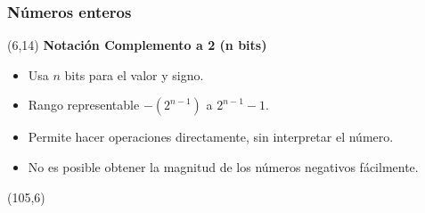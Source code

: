 \documentclass[aspectratio=169]{beamer}
\begin{document}
\begin{frame}[fragile]
    \frametitle{Números enteros}
    \begin{textblock}{90}(6,14)
    \textbf{Notación Complemento a 2 (n bits)}
    \begin{itemize}
    \item Usa $n$ bits para el valor y signo.
    \item Rango representable $-(2^{n-1})$ a $2^{n-1}-1$.
    \item Permite hacer operaciones directamente, sin interpretar el número.
    \item No es posible obtener la magnitud de los números negativos fácilmente.
    \end{itemize}
    \end{textblock}
    
    \begin{textblock}{90}(105,6)
    \end{textblock}

\end{frame}
\end{document}
